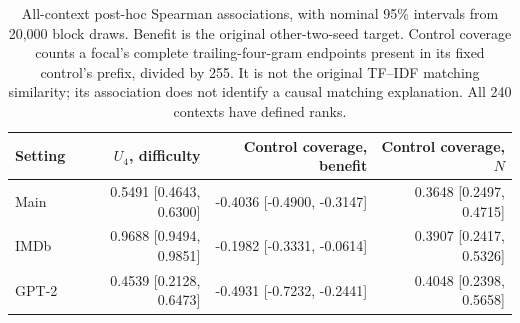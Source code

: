 \begin{table}[tp]
\centering
\footnotesize
\setlength{\tabcolsep}{3pt}
\begin{tabular}{lrrr}
\toprule
Setting & $U_4$, difficulty & Control coverage, benefit & Control coverage, $N$ \\
\midrule
Main & 0.5491 [0.4643, 0.6300] & -0.4036 [-0.4900, -0.3147] & 0.3648 [0.2497, 0.4715] \\
IMDb & 0.9688 [0.9494, 0.9851] & -0.1982 [-0.3331, -0.0614] & 0.3907 [0.2417, 0.5326] \\
GPT-2 & 0.4539 [0.2128, 0.6473] & -0.4931 [-0.7232, -0.2441] & 0.4048 [0.2398, 0.5658] \\
\bottomrule
\end{tabular}
\caption{All-context post-hoc Spearman associations, with nominal 95\% intervals from 20,000 block draws. Benefit is the original other-two-seed target. Control coverage counts a focal's complete trailing-four-gram endpoints present in its fixed control's prefix, divided by 255. It is not the original TF--IDF matching similarity; its association does not identify a causal matching explanation. All 240 contexts have defined ranks.}
\label{tab:review_input_associations}
\end{table}
